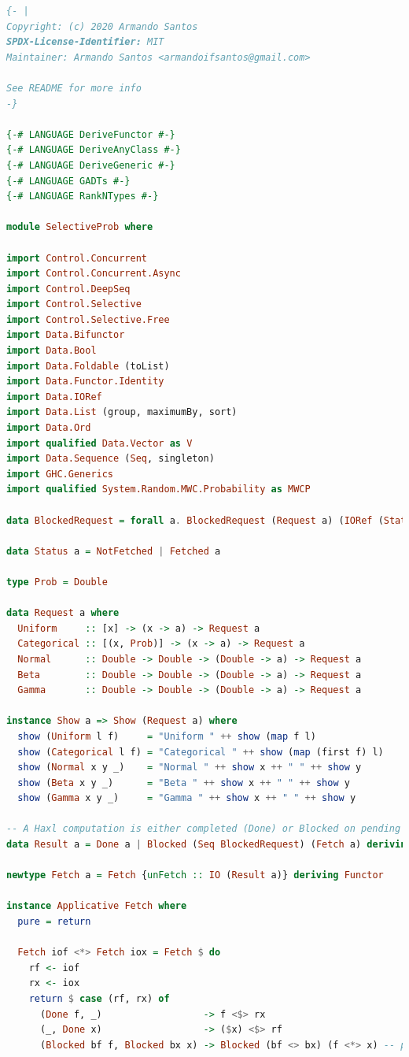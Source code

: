 \documentclass[
  oneside,
  11pt, a4paper,
  footinclude=true,
  headinclude=true,
  cleardoublepage=empty
]{scrbook}
\theoremstyle{definition}
\theoremstyle{definition}
\begin{document}
    \begin{lstlisting}[language=Haskell, caption={Selective probabilistic programming library},captionpos=b]
{- |
Copyright: (c) 2020 Armando Santos
SPDX-License-Identifier: MIT
Maintainer: Armando Santos <armandoifsantos@gmail.com>

See README for more info
-}

{-# LANGUAGE DeriveFunctor #-}
{-# LANGUAGE DeriveAnyClass #-}
{-# LANGUAGE DeriveGeneric #-}
{-# LANGUAGE GADTs #-}
{-# LANGUAGE RankNTypes #-}

module SelectiveProb where

import Control.Concurrent
import Control.Concurrent.Async
import Control.DeepSeq
import Control.Selective
import Control.Selective.Free
import Data.Bifunctor
import Data.Bool
import Data.Foldable (toList)
import Data.Functor.Identity
import Data.IORef
import Data.List (group, maximumBy, sort)
import Data.Ord
import qualified Data.Vector as V
import Data.Sequence (Seq, singleton)
import GHC.Generics
import qualified System.Random.MWC.Probability as MWCP

data BlockedRequest = forall a. BlockedRequest (Request a) (IORef (Status a))

data Status a = NotFetched | Fetched a

type Prob = Double

data Request a where
  Uniform     :: [x] -> (x -> a) -> Request a
  Categorical :: [(x, Prob)] -> (x -> a) -> Request a
  Normal      :: Double -> Double -> (Double -> a) -> Request a
  Beta        :: Double -> Double -> (Double -> a) -> Request a
  Gamma       :: Double -> Double -> (Double -> a) -> Request a

instance Show a => Show (Request a) where
  show (Uniform l f)     = "Uniform " ++ show (map f l)
  show (Categorical l f) = "Categorical " ++ show (map (first f) l)
  show (Normal x y _)    = "Normal " ++ show x ++ " " ++ show y
  show (Beta x y _)      = "Beta " ++ show x ++ " " ++ show y
  show (Gamma x y _)     = "Gamma " ++ show x ++ " " ++ show y

-- A Haxl computation is either completed (Done) or Blocked on pending data requests
data Result a = Done a | Blocked (Seq BlockedRequest) (Fetch a) deriving Functor

newtype Fetch a = Fetch {unFetch :: IO (Result a)} deriving Functor

instance Applicative Fetch where
  pure = return

  Fetch iof <*> Fetch iox = Fetch $ do
    rf <- iof
    rx <- iox
    return $ case (rf, rx) of
      (Done f, _)                  -> f <$> rx
      (_, Done x)                  -> ($x) <$> rf
      (Blocked bf f, Blocked bx x) -> Blocked (bf <> bx) (f <*> x) -- parallelism


\end{lstlisting}
\end{document}
